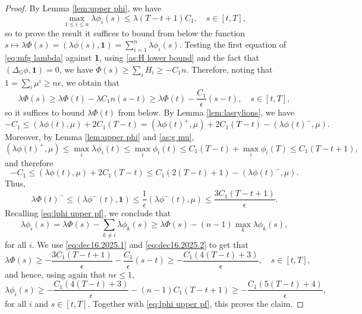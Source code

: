 \documentclass[10pt]{article}
\numberwithin{equation}{section}
\def\G{\mathbb{G}}
\begin{document}
\begin{proof} By Lemma \ref{lem:upper phi}, we have
\begin{equation} \label{eq:lphi upper pf}
\max_{1\leq i\leq n} \lambda \phi_i(s) \leq \lambda (T-t+1)C_1, \quad s\in [t,T],
\end{equation}
so to prove the result it suffices to bound from below the function $s \mapsto \lambda\Phi(s)=(\lambda \phi(s),\textbf{1})=\sum_{i=1}^{n}\lambda\phi_i(s).$
Testing the first equation of \eqref{eq:mfg lambda} against \textbf{1}, using \eqref{as:H lower bound} and the fact that $(\Delta_{\G}\phi,\textbf{1})=0$, we have
$\dot \Phi(s)\geq\sum_{i}H_i \geq -C_1n.$
Therefore, noting that $1=\sum_{i}\mu^i\geq n\epsilon$, we obtain that
\begin{equation} \label{eq:dec16.2025.1}
\lambda \Phi(s)\geq \lambda \Phi(t)-\lambda C_1n(s-t)\geq \lambda \Phi(t)-\frac{C_1 }{\epsilon}(s-t),\quad s\in [t,T],
\end{equation}
so it suffices to bound $\lambda \Phi(t)$ from below. By Lemma \ref{lem:lasrylions}, we have
\begin{equation}
    -C_1 \leq (\lambda \phi(t),\mu)+2C_1(T-t) = (\lambda \phi(t)^+,\mu)+2C_1(T-t) -(\lambda\phi(t)^-,\mu).
\end{equation}
Moreover, by Lemma \ref{lem:upper phi} and \eqref{as:g mu},
\[
(\lambda \phi(t)^+,\mu)\le \max_{i}\lambda \phi_i(t)\le \max_i \phi_i(t)\le C_1(T-t)+\max_i\phi_i(T)\le C_1(T-t+1),
\]
and therefore
\begin{equation}
    -C_1 \leq (\lambda \phi(t),\mu)+2C_1(T-t) \leq C_1(2(T-t)+1) -(\lambda \phi(t)^-,\mu).
\end{equation}
Thus,
\begin{equation}\label{eq:dec16.2025.2}
    \lambda \Phi(t)^-\leq (\lambda \phi^-(t),\textbf{1})\leq \frac{1}{\epsilon}(\lambda \phi^-(t),\mu)\leq\frac{3C_1(T-t+1)}{\epsilon}.
\end{equation}
Recalling \eqref{eq:lphi upper pf}, we conclude that
\[
\lambda \phi_i(s)=  \lambda\Phi(s)-\sum_{k \not =i } \lambda \phi_k(s)
\geq \lambda\Phi(s) - (n-1)\max_k\lambda\phi_k(s),
\]
for all $i$. We use \eqref{eq:dec16.2025.1} and \eqref{eq:dec16.2025.2} to get that
\[
\lambda\Phi(s)\ge -\frac{3C_1(T-t+1)}{\epsilon}-\frac{C_1}{\epsilon}(s-t)\ge -\frac{C_1(4(T-t)+3)}{\epsilon}, \quad s\in[t,T],
\]
and hence, using again that $n\epsilon\le 1$,
\[
\lambda \phi_i(s)\ge -\frac{C_1(4(T-t)+3)}{\epsilon}-(n-1)C_1(T-t+1)\ge -\frac{C_1(5(T-t)+4)}{\epsilon},
\]
for all $i$ and $s \in [t,T].$ Together with \eqref{eq:lphi upper pf}, this proves the claim.
\end{proof}
\end{document}
